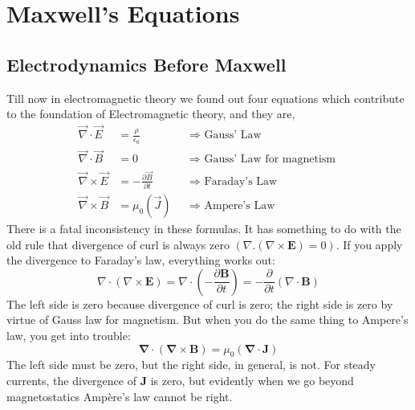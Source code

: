 \chapter{Maxwell's Equations }
\section{Electrodynamics Before Maxwell}
Till now in electromagnetic theory we found out four equations which contribute to the foundation of Electromagnetic theory, and they are,
\begin{align*}
\vec{\nabla} \cdot \vec{E}&=\frac{\rho}{\epsilon_{0}} \quad && \Rightarrow \text { Gauss' Law }  \\
\vec{\nabla} \cdot \vec{B}&=0 \quad && \Rightarrow \text { Gauss' Law for magnetism } \\
\vec{\nabla} \times \vec{E}&=-\frac{\partial \vec{B}}{\partial t} && \Rightarrow \text { Faraday's Law } \\
\vec{\nabla} \times \vec{B}&=\mu_{0}\left(\vec{J}\right) && \Rightarrow \text { Ampere's Law }
\end{align*}
There is a fatal inconsistency in these formulas. It has something to do with the old rule that divergence of curl is always zero $ (\nabla .(\nabla \times \mathbf{E})=0)$. If you apply the divergence to Faraday's law, everything works out: 
$$\nabla \cdot(\nabla \times \mathbf{E})=\nabla \cdot\left(-\frac{\partial \mathbf{B}}{\partial t}\right)=-\frac{\partial}{\partial t}(\nabla \cdot \mathbf{B})$$
The left side is zero because divergence of curl is zero; the right side is zero by virtue of Gauss law for magnetism. But when you do the same thing to Ampere's law, you get into trouble:$$\boldsymbol{\nabla} \cdot(\boldsymbol{\nabla} \times \mathbf{B})=\mu_{0}(\boldsymbol{\nabla} \cdot \mathbf{J})$$ The left side must be zero, but the right side, in general, is not. For steady currents, the divergence of $\mathbf{J}$ is zero, but evidently when we go beyond magnetostatics Ampère's law cannot be right.
